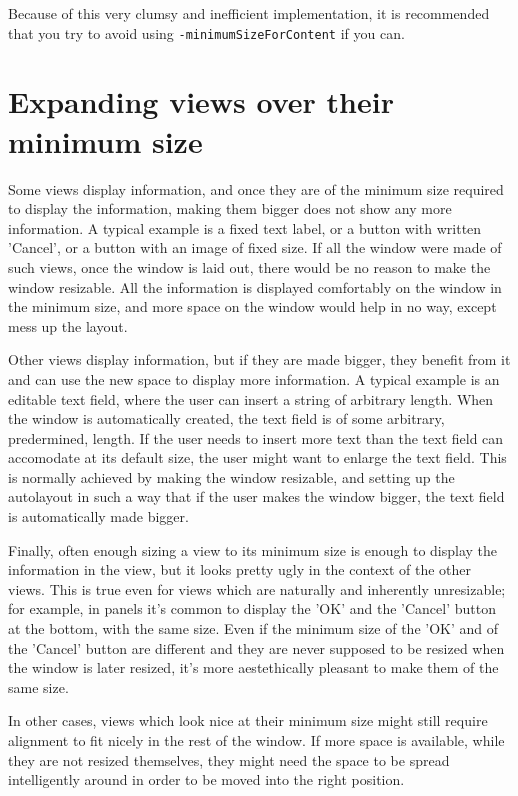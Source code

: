 Because of this very clumsy and inefficient implementation, it is
recommended that you try to avoid using
\texttt{-minimumSizeForContent} if you can.

\section{Expanding views over their minimum size}
Some views display information, and once they are of the minimum size
required to display the information, making them bigger does not show
any more information.  A typical example is a fixed text label, or a
button with written 'Cancel', or a button with an image of fixed size.
If all the window were made of such views, once the window is laid
out, there would be no reason to make the window resizable.  All the
information is displayed comfortably on the window in the minimum
size, and more space on the window would help in no way, except mess
up the layout.

Other views display information, but if they are made bigger, they
benefit from it and can use the new space to display more information.
A typical example is an editable text field, where the user can insert
a string of arbitrary length.  When the window is automatically
created, the text field is of some arbitrary, predermined, length.  If
the user needs to insert more text than the text field can accomodate
at its default size, the user might want to enlarge the text field.
This is normally achieved by making the window resizable, and setting
up the autolayout in such a way that if the user makes the window
bigger, the text field is automatically made bigger.

Finally, often enough sizing a view to its minimum size is enough to
display the information in the view, but it looks pretty ugly in the
context of the other views.  This is true even for views which are
naturally and inherently unresizable; for example, in panels it's
common to display the 'OK' and the 'Cancel' button at the bottom, with
the same size.  Even if the minimum size of the 'OK' and of the
'Cancel' button are different and they are never supposed to be
resized when the window is later resized, it's more aestethically
pleasant to make them of the same size.

In other cases, views which look nice at their minimum size might
still require alignment to fit nicely in the rest of the window.  If
more space is available, while they are not resized themselves, they
might need the space to be spread intelligently around in order to be
moved into the right position.

